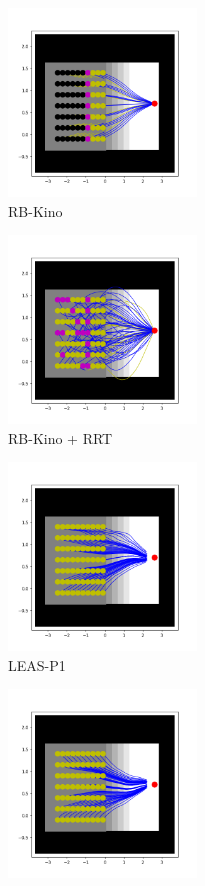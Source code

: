 \begin{figure}[ht]
    \captionsetup[subfigure]{justification=centering}
    \centering
    \begin{subfigure}[t]{0.48\linewidth}
        \includegraphics[width=\textwidth, height=5cm]{Figures/Chapter_CPSB/stairs_kino.png}
        \caption{RB-Kino\label{fig:cp-sb:stairs_sm_kino}}
    \end{subfigure}
    \begin{subfigure}[t]{0.48\linewidth}
        \includegraphics[width=\textwidth, height=5cm]{Figures/Chapter_CPSB/stairs_kino_rrt.png}
        \caption{RB-Kino + RRT\label{fig:cp-sb:stairs_sm_kino_rrt}}
    \end{subfigure}
    \begin{subfigure}[t]{0.48\linewidth}
        \includegraphics[width=\textwidth, height=5cm]{Figures/Chapter_CPSB/stairs_leas_p1.png}
        \caption{LEAS-P1}
    \end{subfigure}
    \begin{subfigure}[t]{0.48\linewidth}
        \includegraphics[width=\textwidth, height=5cm]{Figures/Chapter_CPSB/stairs_leas_p2.png}

\end{subfigure}
\end{figure}
